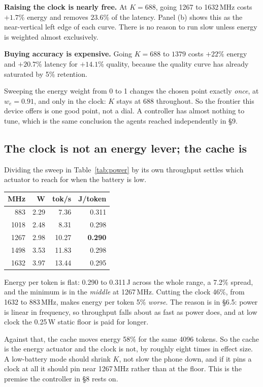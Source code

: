 \documentclass[11pt]{article}
\begin{document}
\textbf{Raising the clock is nearly free.} At $K{=}688$, going 1267 to 1632\,MHz costs
$+1.7\%$ energy and removes $23.6\%$ of the latency. Panel (b) shows this as the near-vertical
left edge of each curve. There is no reason to run slow unless energy is weighted almost
exclusively.

\textbf{Buying accuracy is expensive.} Going $K{=}688$ to $1379$ costs $+22\%$ energy and
$+20.7\%$ latency for $+14.1\%$ quality, because the quality curve has already saturated by
5\% retention.

Sweeping the energy weight from 0 to 1 changes the chosen point exactly \emph{once}, at
$w_e{=}0.91$, and only in the clock: $K$ stays at 688 throughout. So the frontier this device
offers is one good point, not a dial. A controller has almost nothing to tune, which is the
same conclusion the agents reached independently in \S9.

\subsection{The clock is not an energy lever; the cache is}
Dividing the sweep in Table~\ref{tab:power} by its own throughput settles which actuator to
reach for when the battery is low.

\begin{center}\small
\begin{tabular}{@{}rrrr@{}}
\toprule
\textbf{MHz} & \textbf{W} & \textbf{tok/s} & \textbf{J/token}\\
\midrule
883  & 2.29 & 7.36  & 0.311\\
1018 & 2.48 & 8.31  & 0.298\\
1267 & 2.98 & 10.27 & \textbf{0.290}\\
1498 & 3.53 & 11.83 & 0.298\\
1632 & 3.97 & 13.44 & 0.295\\
\bottomrule
\end{tabular}
\end{center}

\noindent Energy per token is flat: 0.290 to 0.311\,J across the whole range, a 7.2\% spread,
and the minimum is in the \emph{middle} at 1267\,MHz. Cutting the clock 46\%, from 1632 to
883\,MHz, makes energy per token 5\% \emph{worse}. The reason is in \S6.5: power is linear in
frequency, so throughput falls about as fast as power does, and at low clock the 0.25\,W static
floor is paid for longer.

Against that, the cache moves energy 58\% for the same 4096 tokens. So the cache is the energy
actuator and the clock is not, by roughly eight times in effect size. A low-battery mode should
shrink $K$, not slow the phone down, and if it pins a clock at all it should pin near 1267\,MHz
rather than at the floor. This is the premise the controller in \S8 rests on.
\end{document}
